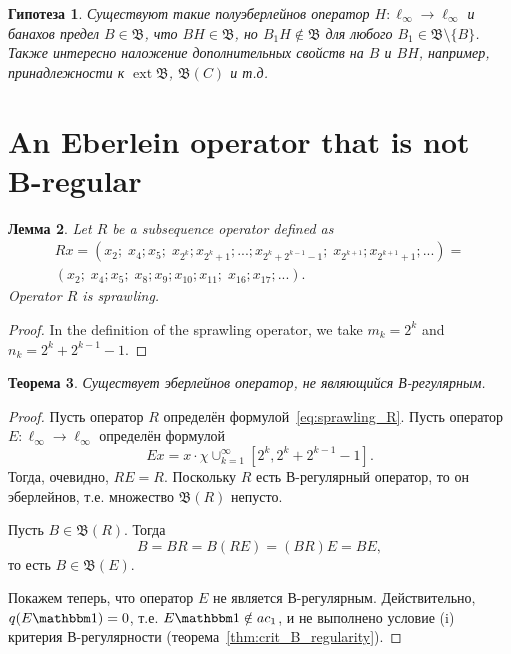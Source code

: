 \documentclass[a4paper,14pt]{article} %
\DeclareMathOperator{\ext}{ext}
\newcommand{\B}{\ensuremath{\mathfrak{B}}}
\newcommand{\one}{\ensuremath{\mathbbm 1}}
\theoremstyle{plain}
\newtheorem{lemma}{Лемма}[section]
\newtheorem{theorem}[lemma]{Теорема}
\newtheorem{hypothesis}[lemma]{Гипотеза}
\begin{document}
	\begin{hypothesis}
		Существуют такие полуэберлейнов оператор $H:\ell_\infty\to\ell_\infty$ и банахов предел $B\in \B$,
		что $BH \in \B$, но $B_1 H \notin \B$ для любого $B_1\in \B\setminus\{B\}$.
		Также интересно наложение дополнительных свойств на $B$ и $BH$, например, принадлежности к $\ext\B$, $\B(C)$ и т.д.
	\end{hypothesis}


\section{An Eberlein operator that is not B-regular}

\begin{lemma}
	\label{lem:R_is_sprawling}
	Let $R$ be a subsequence operator defined as
	\begin{multline}
		\label{eq:sprawling_R}
		Rx = (x_2; \; x_4; x_5; \; x_{2^k}; x_{2^k + 1}; ... ; x_{2^k + 2^{k-1} - 1}; \; x_{2^{k+1}}; x_{2^{k+1} + 1};...)
		=\\
		(x_2; \; x_4; x_5; \; x_8; x_9; x_{10}; x_{11}; \; x_{16}; x_{17}; ...)
		.
	\end{multline}
	Operator $R$ is sprawling.
\end{lemma}

\begin{proof}
	In the definition of the sprawling operator, we take $m_k = 2^k$ and $n_k = 2^k + 2^{k-1} - 1$.
\end{proof}

\begin{theorem}
	\label{thm:Eberlein_but_not_B-regular_exists}
	Существует эберлейнов оператор, не являющийся В-регулярным.
\end{theorem}

\begin{proof}
	Пусть оператор $R$ определён формулой~\eqref{eq:sprawling_R}.
	Пусть оператор $E:\ell_\infty\to\ell_\infty$ определён формулой
	\begin{equation}
		Ex = x \cdot \chi\cup_{k=1}^{\infty}\left[2^{k}, 2^k + 2^{k-1} - 1\right]
		.
	\end{equation}
	Тогда, очевидно, $RE=R$.
	Поскольку $R$ есть В-регулярный оператор, то он эберлейнов,
	т.е. множество $\B(R)$ непусто.

	Пусть $B\in\B(R)$. Тогда
	\begin{equation}
		B = BR = B(RE) = (BR)E = BE
		,
	\end{equation}
	то есть $B\in\B(E)$.

	Покажем теперь, что оператор $E$ не является В-регулярным.
	Действительно, $q(E\one) =0$, т.е. $ E\one \notin ac_1$,
	и не выполнено условие (i) критерия В-регулярности (теорема~\ref{thm:crit_B_regularity}).
\end{proof}
\end{document}
